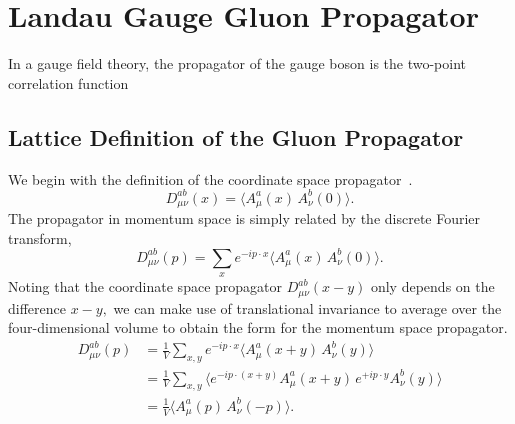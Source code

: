 
\chapter{Landau Gauge Gluon Propagator}
\ifpdf
    \graphicspath{{Chapter4/Figs/Raster/}{Chapter4/Figs/PDF/}{Chapter4/Figs/}}
\else
    \graphicspath{{Chapter4/Figs/Vector/}{Chapter4/Figs/}}
\fi
In a gauge field theory, the propagator of the gauge boson is the two-point correlation function 
\section{Lattice Definition of the Gluon Propagator}
We begin with the definition of the coordinate space propagator~\cite{Zwanziger:1991gz,Cucchieri:1999sz,Langfeld:2001cz}.
\begin{equation}
D^{ab}_{\mu\nu}(x) = \langle A^a_\mu(x) \, A^b_\nu(0)\rangle.
\end{equation}
The propagator in momentum space is simply related by the discrete Fourier transform,
\begin{equation}
D^{ab}_{\mu\nu}(p) = \sum_x e^{-ip\cdot x} \langle A^a_\mu(x) \, A^b_\nu(0) \rangle. 
\end{equation}
Noting that the coordinate space propagator $D^{ab}_{\mu\nu}(x-y)$ only depends on the difference $x-y,$ we can make use of translational invariance to average over the four-dimensional volume to obtain the form for the momentum space propagator.
\begin{align}
D^{ab}_{\mu\nu}(p) &= \frac{1}{V}\sum_{x,y} e^{-ip\cdot x}\langle A^a_\mu(x+y) \, A^b_\nu(y) \rangle \nonumber \\
                &= \frac{1}{V}\sum_{x,y} \langle e^{-ip\cdot (x+y)} A^a_\mu(x+y) \, e^{+ip\cdot y}A^b_\nu(y) \rangle \nonumber \\
                &= \frac{1}{V}\langle A^a_\mu(p) \, A^b_\nu(-p) \rangle. \label{eq:gluPropxtop}
\end{align}

